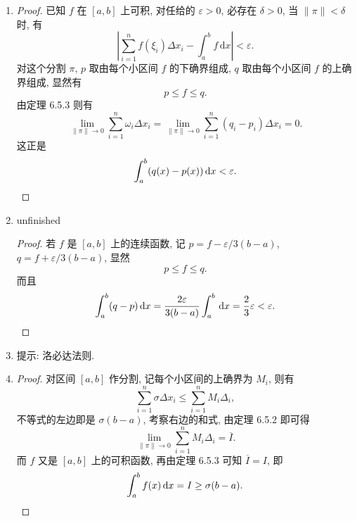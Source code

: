 % 
\begin{enumerate}
    \item %
        \begin{proof}
            已知 $f$ 在 $[a, b]$ 上可积, 对任给的 $\varepsilon > 0$, 必存在 $\delta > 0$, 当 $\|\pi\| < \delta$ 时, 有
            \[
                \left| \sum_{i = 1}^nf(\xi_i)\Delta x_i - \int_a^b f\,\mathrm{d}x \right| < \varepsilon.    
            \]
            对这个分割 $\pi$, $p$ 取由每个小区间 $f$ 的下确界组成, $q$ 取由每个小区间 $f$ 的上确界组成, 显然有
            \[
                p \leq f \leq q.
            \]
            由定理 6.5.3 则有
            \[
                \lim_{\|\pi\|\to0}\sum_{i=1}^n\omega_i\Delta x_i = \lim_{\|\pi\|\to0}\sum_{i=1}^n(q_i-p_i)\Delta x_i= 0.   
            \]
            这正是
            \[
                \int_a^b(q(x) - p(x))\,\mathrm{d}x < \varepsilon. \qedhere   
            \]
        \end{proof}
    \item %
        {\color{red}unfinished}\begin{proof}
            若 $f$ 是 $[a, b]$ 上的连续函数, 记 $p = f - \varepsilon/3(b-a)$, $q = f + \varepsilon/3(b-a)$, 显然
            \[
                p \leq f \leq q.    
            \]
            而且
            \[
                \int_a^b (q - p)\,\mathrm{d}x = \frac{2\varepsilon}{3(b-a)}\int_a^b\,\mathrm{d}x = \frac23\varepsilon < \varepsilon. \qedhere   
            \]
        \end{proof}
    \item %
        提示: 洛必达法则.
    \item %
        \begin{proof}
            对区间 $[a, b]$ 作分割, 记每个小区间的上确界为 $M_i$, 则有
            \[
                \sum_{i=1}^n\sigma\Delta x_i \leq \sum_{i=1}^nM_i\Delta_i,    
            \]
            不等式的左边即是 $\sigma(b-a)$, 考察右边的和式, 由定理 6.5.2 即可得
            \[
                \lim_{\|\pi\|\to0}\sum_{i=1}^nM_i\Delta_i = \overline{I}.   
            \]
            而 $f$ 又是 $[a, b]$ 上的可积函数, 再由定理 6.5.3 可知 $\overline{I} = I$, 即
            \[
                \int_a^b f(x)\,\mathrm{d}x = I \geq \sigma(b - a). \qedhere    
            \]
        \end{proof}
\end{enumerate}
% 
